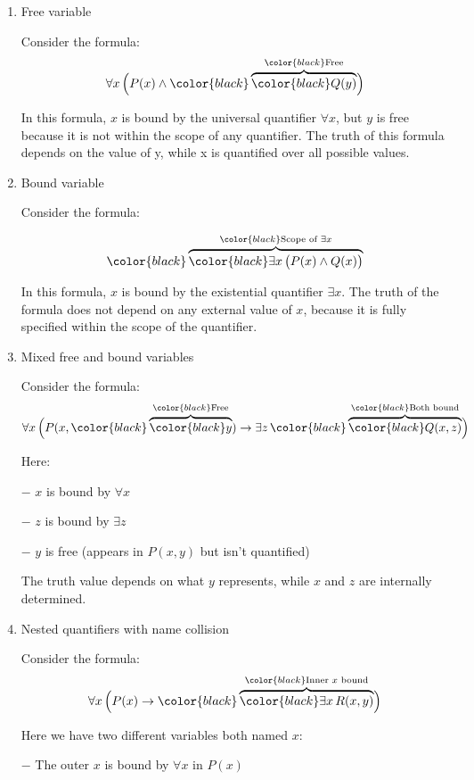 \begin{enumerate}
\def\labelenumi{\arabic{enumi}.}
\item
  Free variable

  Consider the formula: \[
   \forall x \, \Big(
   P(x) \wedge 
   {\color{black}\overbrace{\color{black}Q(y)}^{\color{black}\text{Free}}}
   \Big)
   \]

  In this formula, \(x\) is bound by the universal quantifier
  \(\forall x\), but \(y\) is free because it is not within the scope of
  any quantifier. The truth of this formula depends on the value of y,
  while x is quantified over all possible values.
\item
  Bound variable

  Consider the formula:

  \[
   {\color{black}\overbrace{\color{black}\exists x\,
   \big(
   P(x) \wedge Q(x)
   \big)
   }^{\color{black}\text{Scope of } \exists x}}
   \]

  In this formula, \(x\) is bound by the existential quantifier
  \(\exists x\). The truth of the formula does not depend on any
  external value of \(x\), because it is fully specified within the
  scope of the quantifier.
\item
  Mixed free and bound variables

  Consider the formula: \[
   \forall x \, \Big(
   P(x, {\color{black}\overbrace{\color{black}y}^{\color{black}\text{Free}}}) \rightarrow 
   \exists z \, 
   {\color{black}\overbrace{\color{black}Q(x, z)}^{\color{black}\text{Both bound}}}
   \Big)
   \]

  Here:

  − \(x\) is bound by \(\forall x\)

  − \(z\) is bound by \(\exists z\)

  − \(y\) is free (appears in \(P(x,y)\) but isn't quantified)

  The truth value depends on what \(y\) represents, while \(x\) and
  \(z\) are internally determined.
\item
  Nested quantifiers with name collision

  Consider the formula: \[
   \forall x \, \Big(
   P(x) \rightarrow 
   {\color{black}\overbrace{\color{black}\exists x \, R(x, y)}^{\color{black}\text{Inner } x \text{ bound}}}
   \Big)
   \]

  Here we have two different variables both named \(x\):

  − The outer \(x\) is bound by \(\forall x\) in \(P(x)\)


\end{enumerate}

